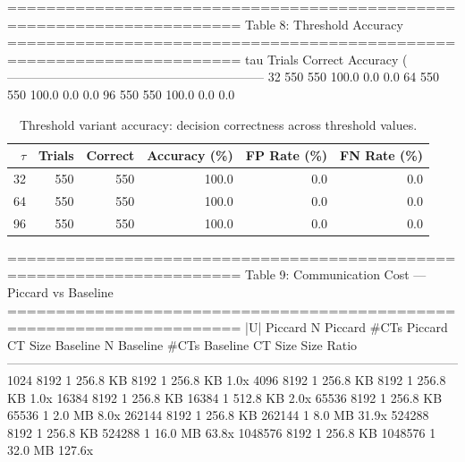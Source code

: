 ======================================================================
  Table 8: Threshold Accuracy
======================================================================
  tau  Trials  Correct  Accuracy (%
--------------------------------------------------------------
   32     550      550         100.0          0.0          0.0
   64     550      550         100.0          0.0          0.0
   96     550      550         100.0          0.0          0.0

\begin{table}[t]
\centering
\caption{Threshold variant accuracy: decision correctness across threshold values.}
\label{tab:threshold-accuracy}
\begin{tabular}{rrrrrr}
\toprule
$\tau$ & Trials & Correct & Accuracy (\%) & FP Rate (\%) & FN Rate (\%) \\
\midrule
32 & 550 & 550 & 100.0 & 0.0 & 0.0 \\
64 & 550 & 550 & 100.0 & 0.0 & 0.0 \\
96 & 550 & 550 & 100.0 & 0.0 & 0.0 \\
\bottomrule
\end{tabular}
\end{table}


======================================================================
  Table 9: Communication Cost — Piccard vs Baseline
======================================================================
      |U|  Piccard N  Piccard #CTs  Piccard CT Size  Baseline N  Baseline #CTs  Baseline CT Size  Size Ratio
------------------------------------------------------------------------------------------------------------
     1024       8192             1         256.8 KB        8192              1          256.8 KB        1.0x
     4096       8192             1         256.8 KB        8192              1          256.8 KB        1.0x
    16384       8192             1         256.8 KB       16384              1          512.8 KB        2.0x
    65536       8192             1         256.8 KB       65536              1            2.0 MB        8.0x
   262144       8192             1         256.8 KB      262144              1            8.0 MB       31.9x
   524288       8192             1         256.8 KB      524288              1           16.0 MB       63.8x
  1048576       8192             1         256.8 KB     1048576              1           32.0 MB      127.6x

